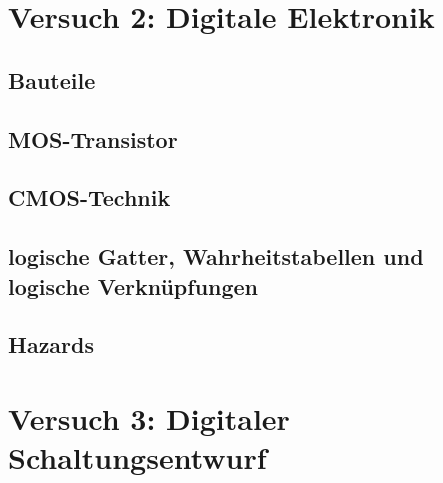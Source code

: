 \documentclass[paper=a4, fontsize=11pt]{scrartcl}
\numberwithin{equation}{section}
\numberwithin{figure}{section}
\numberwithin{table}{section}
\begin{document}

\newpage

\section{Versuch 2: Digitale Elektronik}



\subsection{Bauteile}



\subsection{MOS-Transistor}



\subsection{CMOS-Technik}



\subsection{logische Gatter, Wahrheitstabellen und logische Verknüpfungen}



\subsection{Hazards}


\newpage

\section{Versuch 3: Digitaler Schaltungsentwurf}

\end{document}

